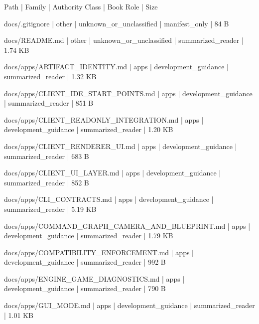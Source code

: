\documentclass[11pt,a4paper]{report}
\begin{document}
{\small\ttfamily\raggedright Path | Family | Authority Class | Book Role | Size\par}
{\small\ttfamily\raggedright docs/\allowbreak{}.\allowbreak{}gitignore | other | unknown\_or\_unclassified | manifest\_only | 84 B\par}
{\small\ttfamily\raggedright docs/\allowbreak{}README.\allowbreak{}md | other | unknown\_or\_unclassified | summarized\_reader | 1.\allowbreak{}74 KB\par}
{\small\ttfamily\raggedright docs/\allowbreak{}apps/\allowbreak{}ARTIFACT\_IDENTITY.\allowbreak{}md | apps | development\_guidance | summarized\_reader | 1.\allowbreak{}32 KB\par}
{\small\ttfamily\raggedright docs/\allowbreak{}apps/\allowbreak{}CLIENT\_IDE\_START\_POINTS.\allowbreak{}md | apps | development\_guidance | summarized\_reader | 851 B\par}
{\small\ttfamily\raggedright docs/\allowbreak{}apps/\allowbreak{}CLIENT\_READONLY\_INTEGRATION.\allowbreak{}md | apps | development\_guidance | summarized\_reader | 1.\allowbreak{}20 KB\par}
{\small\ttfamily\raggedright docs/\allowbreak{}apps/\allowbreak{}CLIENT\_RENDERER\_UI.\allowbreak{}md | apps | development\_guidance | summarized\_reader | 683 B\par}
{\small\ttfamily\raggedright docs/\allowbreak{}apps/\allowbreak{}CLIENT\_UI\_LAYER.\allowbreak{}md | apps | development\_guidance | summarized\_reader | 852 B\par}
{\small\ttfamily\raggedright docs/\allowbreak{}apps/\allowbreak{}CLI\_CONTRACTS.\allowbreak{}md | apps | development\_guidance | summarized\_reader | 5.\allowbreak{}19 KB\par}
{\small\ttfamily\raggedright docs/\allowbreak{}apps/\allowbreak{}COMMAND\_GRAPH\_CAMERA\_AND\_BLUEPRINT.\allowbreak{}md | apps | development\_guidance | summarized\_reader | 1.\allowbreak{}79 KB\par}
{\small\ttfamily\raggedright docs/\allowbreak{}apps/\allowbreak{}COMPATIBILITY\_ENFORCEMENT.\allowbreak{}md | apps | development\_guidance | summarized\_reader | 992 B\par}
{\small\ttfamily\raggedright docs/\allowbreak{}apps/\allowbreak{}ENGINE\_GAME\_DIAGNOSTICS.\allowbreak{}md | apps | development\_guidance | summarized\_reader | 790 B\par}
{\small\ttfamily\raggedright docs/\allowbreak{}apps/\allowbreak{}GUI\_MODE.\allowbreak{}md | apps | development\_guidance | summarized\_reader | 1.\allowbreak{}01 KB\par}
\end{document}
